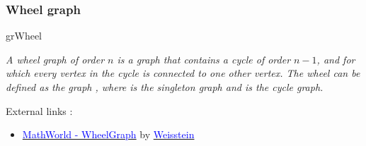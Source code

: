 \newpage 
\subsubsection{Wheel graph} 

\begin{NewMacroBox}{grWheel}{}

\medskip
\emph{A wheel graph   of order $n$  is a graph that contains a cycle of order $n-1$, and for which every  vertex in the cycle is connected to one other  vertex. The wheel  can be defined as the graph , where  is the singleton graph and  is the cycle graph.}

\medskip
External links :

\medskip
\begin{itemize}
\item \href{http://mathworld.wolfram.com/WheelGraph.html}%
           {\textcolor{blue}{MathWorld - WheelGraph}} by %
      \href{http://en.wikipedia.org/wiki/Eric_W._Weisstein}%
           {\textcolor{blue}{Weisstein}}
\end{itemize}
\end{NewMacroBox}

\SetUpEdge[style={thick,%
                  double          = orange,%
                  double distance = 1pt}]

\SetVertexNoLabel
{}
 
\vfill
\subsubsection{}
\begin{center}
\begin{tkzexample}[vbox]
\end{tkzexample}
\end{center}

